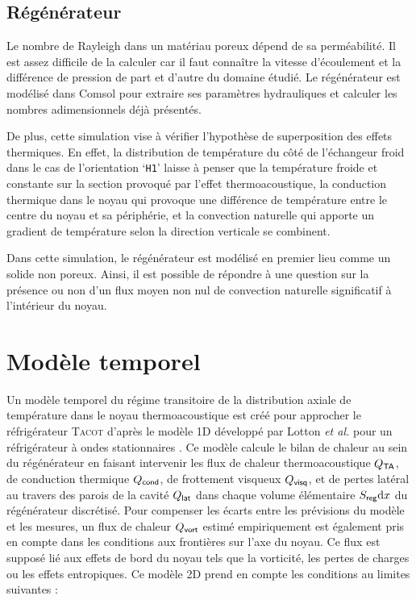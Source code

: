 \subsection{Régénérateur}
Le nombre de Rayleigh dans un matériau poreux dépend de sa perméabilité. Il est assez difficile de la calculer car il faut connaître la vitesse d'écoulement et la différence de pression de part et d'autre du domaine étudié. Le régénérateur est modélisé dans Comsol pour extraire ses paramètres hydrauliques et calculer les nombres adimensionnels déjà présentés.

De plus, cette simulation vise à vérifier l'hypothèse de superposition des effets thermiques. En effet, la distribution de température du côté de l'échangeur froid dans le cas de l'orientation `\texttt{H1}' laisse à penser que la température froide et constante sur la section provoqué par l'effet thermoacoustique, la conduction thermique dans le noyau qui provoque une différence de température entre le centre du noyau et sa périphérie, et la convection naturelle qui apporte un gradient de température selon la direction verticale se combinent.

Dans cette simulation, le régénérateur est modélisé en premier lieu comme un solide non poreux. Ainsi, il est possible de répondre à une question sur la présence ou non d'un flux moyen non nul de convection naturelle significatif à l'intérieur du noyau.

\section{Modèle temporel} \label{chap:ModeleTemporel}
Un modèle temporel du régime transitoire de la distribution axiale de température dans le noyau thermoacoustique est créé pour approcher le réfrigérateur \textsc{Tacot} d'après le modèle 1D développé par Lotton \textit{et al.} pour un réfrigérateur à ondes stationnaires \cite{lotton_transient_2009}. Ce modèle calcule le bilan de chaleur au sein du régénérateur en faisant intervenir les flux de chaleur thermoacoustique $Q_{\sf TA}$, de conduction thermique $Q_{\sf cond}$, de frottement visqueux $Q_{\sf visq}$, et de pertes latéral au travers des parois de la cavité $Q_{\sf lat}$ dans chaque volume élémentaire $S_{\sf reg} \mathrm{d} x$ du régénérateur discrétisé. Pour compenser les écarts entre les prévisions du modèle et les mesures, un flux de chaleur $Q_{\sf vort}$ estimé empiriquement est également pris en compte dans les conditions aux frontières sur l'axe du noyau. Ce flux est supposé lié aux effets de bord du noyau tels que la vorticité, les pertes de charges ou les effets entropiques. Ce modèle 2D prend en compte les conditions au limites suivantes : 



